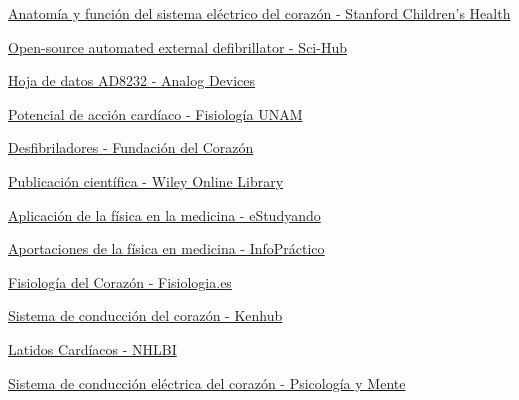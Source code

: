 \begin{thebibliography}{99}

  \href{https://www.stanfordchildrens.org/es/topic/default?id=anatomyandfunctionoftheheartselectricalsystem-85-P03337}{Anatomía y función del sistema eléctrico del corazón - Stanford Children's Health}
  
  \href{https://sci-hub.mksa.top/10.1016/j.ohx.2017.09.001}{Open-source automated external defibrillator - Sci-Hub}
  
  \href{https://www.analog.com/media/en/technical-documentation/data-sheets/ad8232.pdf}{Hoja de datos AD8232 - Analog Devices}
  
  \href{https://fisiologia.facmed.unam.mx/wp-content/uploads/2019/10/Practica-potencial-de-acci\%C3\%B3n-cardiaco.pdf}{Potencial de acción cardíaco - Fisiología UNAM}
  
  \href{https://fundaciondelcorazon.com/informacion-para-pacientes/tratamientos/desfibrilador.html}{Desfibriladores - Fundación del Corazón}
  
  \href{https://onlinelibrary.wiley.com/doi/pdf/10.1111/pace.12573}{Publicación científica - Wiley Online Library}
  
  \href{https://estudyando.com/la-aplicacion-de-la-fisica-en-la-medicina/}{Aplicación de la física en la medicina - eStudyando}
  
  \href{https://www.inforpractico.com/aportaciones-de-la-fisica-en-medicina-innovacion-y-avances/}{Aportaciones de la física en medicina - InfoPráctico}
  
  \href{https://www.fisiologia.es/corazon.html}{Fisiología del Corazón - Fisiologia.es}
  
  \href{https://www.kenhub.com/es/library/anatomia-es/sistema-de-conduccion-del-corazon}{Sistema de conducción del corazón - Kenhub}
  
  \href{https://www.nhlbi.nih.gov/es/salud/corazon/latidos-cardiacos}{Latidos Cardíacos - NHLBI}
  
  \href{https://psicologiaymente.com/salud/sistema-conduccion-electrica-corazon}{Sistema de conducción eléctrica del corazón - Psicología y Mente}
  

\end{thebibliography}
